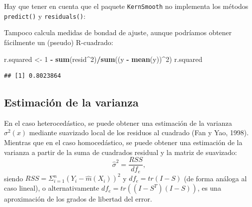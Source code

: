 \documentclass[
]{book}
\newenvironment{Shaded}{\begin{snugshade}}{\end{snugshade}}
\newcommand{\AttributeTok}[1]{\textcolor[rgb]{0.13,0.29,0.53}{#1}}
\newcommand{\CommentTok}[1]{\textcolor[rgb]{0.56,0.35,0.01}{\textit{#1}}}
\newcommand{\DecValTok}[1]{\textcolor[rgb]{0.00,0.00,0.81}{#1}}
\newcommand{\FunctionTok}[1]{\textcolor[rgb]{0.13,0.29,0.53}{\textbf{#1}}}
\newcommand{\NormalTok}[1]{#1}
\newcommand{\OtherTok}[1]{\textcolor[rgb]{0.56,0.35,0.01}{#1}}
\newcommand{\SpecialCharTok}[1]{\textcolor[rgb]{0.81,0.36,0.00}{\textbf{#1}}}
\theoremstyle{break}
\theoremstyle{nonumberplain}
\renewcommand{\CommentTok}[1]{\textcolor[rgb]{0.41,0.41,0.41}{\texttt{#1}}}
\begin{document}
Hay que tener en cuenta que el paquete \texttt{KernSmooth} no implementa los métodos
\texttt{predict()} y \texttt{residuals()}:

\begin{Shaded}
\end{Shaded}

Tampoco calcula medidas de bondad de ajuste, aunque podríamos obtener fácilmente un (pseudo) R-cuadrado:

\begin{Shaded}
\begin{Highlighting}[]
\NormalTok{r.squared }\OtherTok{\textless{}{-}} \DecValTok{1} \SpecialCharTok{{-}} \FunctionTok{sum}\NormalTok{(resid}\SpecialCharTok{\^{}}\DecValTok{2}\NormalTok{)}\SpecialCharTok{/}\FunctionTok{sum}\NormalTok{((y }\SpecialCharTok{{-}} \FunctionTok{mean}\NormalTok{(y))}\SpecialCharTok{\^{}}\DecValTok{2}\NormalTok{)}
\NormalTok{r.squared}
\end{Highlighting}
\end{Shaded}

\begin{verbatim}
## [1] 0.8023864
\end{verbatim}

\subsection{Estimación de la varianza}\label{estimaciuxf3n-de-la-varianza}

En el caso heterocedástico, se puede obtener una estimación de la varianza
\(\sigma^2(x)\) mediante suavizado local de los residuos al cuadrado
(Fan y Yao, 1998). Mientras que en el caso homocedástico, se puede obtener
una estimación de la varianza a partir de la suma de cuadrados residual y la
matriz de suavizado:
\[\hat\sigma^2 = \frac{RSS}{df_e},\]
siendo \(RSS=\Sigma_{i=1}^n \left( Y_i - \hat m(X_i) \right)^2\)
y \(df_e = tr(I - S)\) (de forma análoga al caso lineal), o alternativamente \(df_e = tr \left( (I - S^{T})(I - S)\right)\), es una aproximación de los grados de libertad del error.
\end{document}
